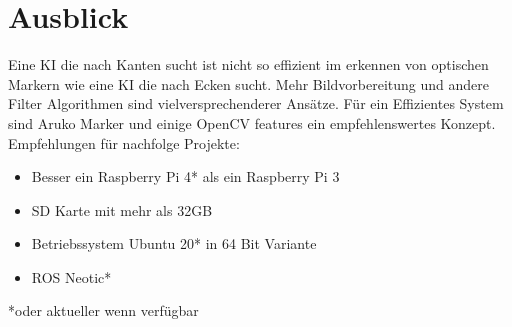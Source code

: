 \documentclass[conference]{IEEEtran}
\begin{document}
\section{Ausblick}
Eine KI die nach Kanten sucht ist nicht so effizient im erkennen von optischen Markern wie eine KI die nach Ecken sucht. Mehr Bildvorbereitung und andere Filter Algorithmen sind vielversprechenderer Ansätze. Für ein Effizientes System sind  Aruko Marker und einige OpenCV features ein empfehlenswertes Konzept. 
\\

Empfehlungen für nachfolge Projekte:
\begin{itemize}
	\item  Besser ein Raspberry Pi 4* als ein Raspberry Pi 3
	\item  SD Karte mit mehr als 32GB
	\item Betriebssystem Ubuntu 20* in 64 Bit Variante
	\item  ROS Neotic*
\end{itemize}
*oder aktueller wenn verfügbar

\end{document}
